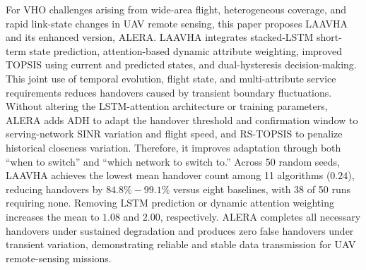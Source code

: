 \documentclass[remotesensing,article,submit,moreauthors]{Definitions/mdpi}
\begin{document}
For VHO challenges arising from wide-area flight, heterogeneous coverage, and rapid link-state changes in UAV remote sensing, this paper proposes LAAVHA and its enhanced version, ALERA. LAAVHA integrates stacked-LSTM short-term state prediction, attention-based dynamic attribute weighting, improved TOPSIS using current and predicted states, and dual-hysteresis decision-making. This joint use of temporal evolution, flight state, and multi-attribute service requirements reduces handovers caused by transient boundary fluctuations. Without altering the LSTM-attention architecture or training parameters, ALERA adds ADH to adapt the handover threshold and confirmation window to serving-network SINR variation and flight speed, and RS-TOPSIS to penalize historical closeness variation. Therefore, it improves adaptation through both ``when to switch'' and ``which network to switch to.'' Across 50 random seeds, LAAVHA achieves the lowest mean handover count among 11 algorithms ($0.24$), reducing handovers by $84.8\%-99.1\%$ versus eight baselines, with 38 of 50 runs requiring none. Removing LSTM prediction or dynamic attention weighting increases the mean to $1.08$ and $2.00$, respectively. ALERA completes all necessary handovers under sustained degradation and produces zero false handovers under transient variation, demonstrating reliable and stable data transmission for UAV remote-sensing missions.

\vspace{6pt}





\end{document}
